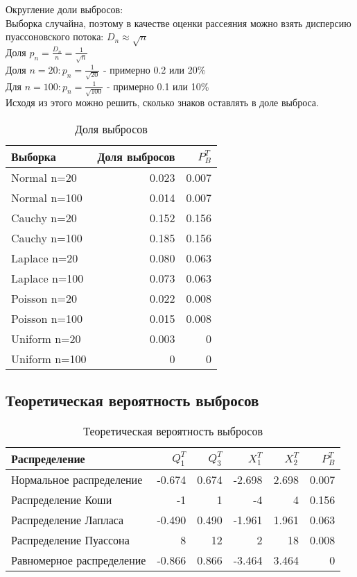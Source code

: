 \documentclass[a4paper]{article}
\begin{document}
\noindent Округление доли выбросов:\\
Выборка случайна, поэтому в качестве оценки рассеяния можно взять дисперсию пуассоновского потока:  $D_n \approx \sqrt{n}$\\
Доля $p_n = \frac{D_n}{n}=\frac{1}{\sqrt{n}}$\\
Доля $n=20: p_n=\frac{1}{\sqrt{20}}$ - примерно 0.2 или 20\% \\
Для $n=100: p_n=\frac{1}{\sqrt{100}}$ - примерно 0.1 или 10\% \\
Исходя из этого можно решить, сколько знаков оставлять в доле выброса.
\begin{table}[H]
		\centering
		\begin{tabular}[t]{lrr}
			\hline
			Выборка   &      Доля выбросов	& $P_B^T$		\\
			\hline
			Normal n=20   	&	0.023 		& 0.007		\\
			Normal n=100   	&  	0.014		& 0.007\\
			Cauchy n=20 	& 	0.152  		& 0.156		\\
			Cauchy n=100	&  	0.185 		& 0.156\\
			Laplace n=20	& 	0.080  		& 0.063	\\
			Laplace n=100	&   0.073 		& 0.063\\
			Poisson n=20	&	0.022 		& 0.008		\\
			Poisson n=100	&	0.015		& 0.008	\\
			Uniform n=20	&	0.003 		& 0		\\
			Uniform n=100	&	0 			& 0	\\
			\hline
		\end{tabular}
		\caption{Доля выбросов}
		\label{tab:normal}
	\end{table}


\subsection{Теоретическая вероятность выбросов}
	\begin{table}[H]
		\centering
		\begin{tabular}[t]{lrrrrr}
			\hline
			Распределение   &      $Q_1^T$	& $Q_3^T$ & $X_1^T$ & $X_2^T$ & $P_B^T$	\\
			\hline
			Нормальное распределение 	& -0.674& 0.674 & -2.698 	&  2.698 	& 0.007 \\
			Распределение Коши 			& -1	& 1		&  -4		& 4			& 0.156 \\
			Распределение Лапласа 		&-0.490	& 0.490	& -1.961	& 1.961		& 0.063\\
			Распределение Пуассона 		& 8		& 12	& 2			& 18		& 0.008 \\
			Равномерное распределение 	&-0.866 & 0.866	& -3.464 	& 3.464 	& 0	\\
			
			\hline
		\end{tabular}
		\caption{Теоретическая вероятность выбросов}
		\label{tab:normal}
	\end{table}
	
\end{document}

